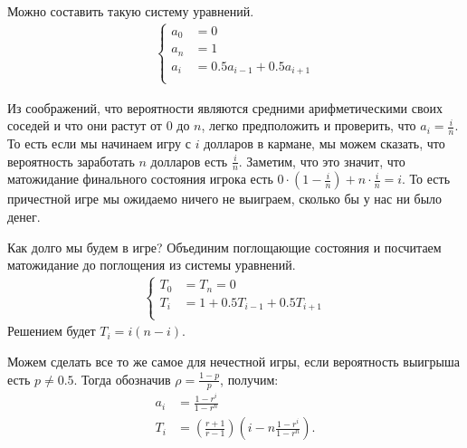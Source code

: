 \documentclass[12pt]{article}
\begin{document}
Можно составить такую систему уравнений.
\begin{align*}
  \begin{cases}
    a_0 &= 0 \\
    a_n &= 1 \\
    a_i &= 0.5 a_{i - 1} + 0.5 a_{i + 1} \\
  \end{cases}
\end{align*}

Из соображений, что вероятности являются средними арифметическими своих соседей и что они растут от 0 до $n$, легко предположить и проверить, что $a_i = \frac{i}{n}$. То есть если мы начинаем игру с $i$ долларов в кармане, мы можем сказать, что вероятность заработать $n$ долларов есть $\frac{i}{n}$. Заметим, что это значит, что матожидание финального состояния игрока есть $0 \cdot (1 - \frac{i}{n}) + n \cdot \frac{i}{n} = i$. То есть причестной игре мы ожидаемо ничего не выиграем, сколько бы у нас ни было денег.

Как долго мы будем в игре? Объединим поглощающие состояния и посчитаем матожидание до поглощения из системы уравнений.
\begin{align*}
  \begin{cases}
    T_0 &= T_n = 0 \\
    T_i &= 1 + 0.5 T_{i - 1} + 0.5 T_{i + 1} \\
  \end{cases}
\end{align*}
Решением будет $T_i = i(n - i)$.

Можем сделать все то же самое для нечестной игры, если вероятность выигрыша есть $p \ne 0.5$. Тогда обозначив $\rho = \frac{1 - p}{p}$, получим:
\begin{align*}
  a_i &= \frac{1 - r^i}{1 - r^n} \\
  T_i &= \left(\frac{r + 1}{r - 1}\right) \left(i - n \frac{1 - r^i}{1 - r^n} \right).
\end{align*}
\end{document}
